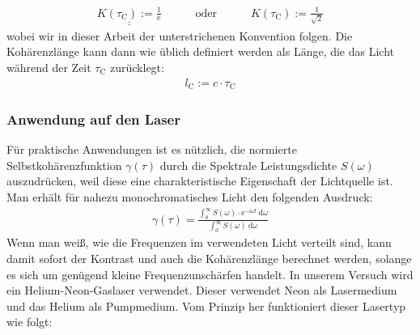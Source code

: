 \documentclass[german,  %
parskip=full,  %
]{scrartcl}
\begin{document}
\begin{align}
\underline{\underline{K(\tau_{\mathrm{C}}) := \frac{1}{\mathrm{e}}}} \quad\quad\quad\text{oder} \quad\quad\quad K(\tau_{\mathrm{C}}) := \frac{1}{\sqrt{2}}
\end{align}
wobei wir in dieser Arbeit der unterstrichenen Konvention folgen. Die Kohärenzlänge kann dann wie üblich definiert werden als Länge, die das Licht während der Zeit \(\tau_{\mathrm{C}}\) zurücklegt:
\begin{align}
l_{\mathrm{C}} := c\cdot\tau_{\mathrm{C}}
\end{align}
\subsubsection{Anwendung auf den Laser}
Für praktische Anwendungen ist es nützlich, die normierte Selbstkohärenzfunktion \(\gamma(\tau)\) durch die Spektrale Leistungsdichte \(S(\omega)\) auszudrücken, weil diese eine charakteristische Eigenschaft der Lichtquelle ist. Man erhält für nahezu monochromatisches Licht den folgenden Ausdruck:
\begin{align}
\gamma(\tau) = \frac{\int_{0}^{\infty} S(\omega)\cdot\mathrm{e}^{-\mathrm{i}\omega t}\ \mathrm{d}\omega}{\int_{0}^{\infty}S(\omega) \ \mathrm{d}\omega}
\end{align}
Wenn man weiß, wie die Frequenzen im verwendeten Licht verteilt sind, kann damit sofort der Kontrast und auch die Kohärenzlänge berechnet werden, solange es sich um genügend kleine Frequenzunschärfen handelt. In unserem Versuch wird ein Helium-Neon-Gaslaser verwendet. Dieser verwendet Neon als Lasermedium und das Helium als Pumpmedium. Vom Prinzip her funktioniert dieser Lasertyp wie folgt:
\end{document}
